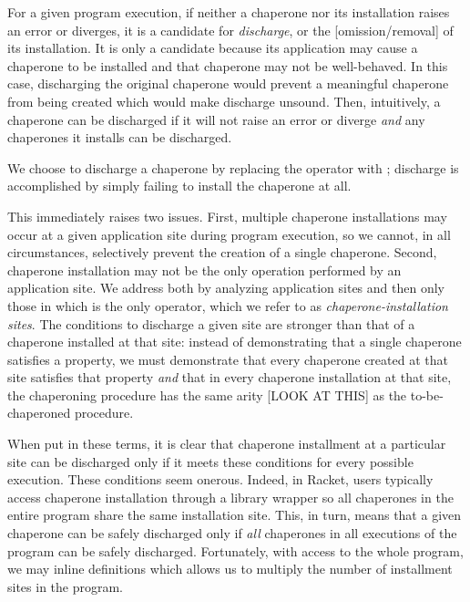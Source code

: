 \documentclass{sigplanconf}
\begin{document}
For a given program execution, if neither a chaperone nor its installation raises an error or diverges, it is a candidate for \emph{discharge}, or the [omission/removal] of its installation.
It is only a candidate because its application may cause a chaperone to be installed and that chaperone may not be well-behaved.
In this case, discharging the original chaperone would prevent a meaningful chaperone from being created which would make discharge unsound.
Then, intuitively, a chaperone can be discharged if it will not raise an error or diverge  \emph{and} any chaperones it installs can be discharged.

We choose to discharge a chaperone by replacing the  operator with ; discharge is accomplished by simply failing to install the chaperone at all.

This immediately raises two issues.
First, multiple chaperone installations may occur at a given application site during program execution, so we cannot, in all circumstances, selectively prevent the creation of a single chaperone.
Second, chaperone installation may not be the only operation performed by an application site.
We address both by analyzing application sites and then only those in which  is the only operator, which we refer to as \emph{chaperone-installation sites}.
The conditions to discharge a given site are stronger than that of a chaperone installed at that site: instead of demonstrating that a single chaperone satisfies a property, we must demonstrate that every chaperone created at that site satisfies that property \emph{and} that in every chaperone installation at that site, the chaperoning procedure has the same arity [LOOK AT THIS] as the to-be-chaperoned procedure.

When put in these terms, it is clear that chaperone installment at a particular site can be discharged only if it meets these conditions for every possible execution.
These conditions seem onerous.
Indeed, in Racket, users typically access chaperone installation through a library wrapper so all chaperones in the entire program share the same installation site.
This, in turn, means that a given chaperone can be safely discharged only if \emph{all} chaperones in all executions of the program can be safely discharged.
Fortunately, with access to the whole program, we may inline definitions which allows us to multiply the number of installment sites in the program.
\end{document}
